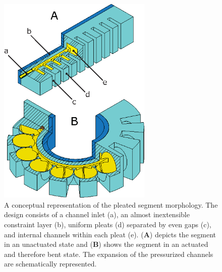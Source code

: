 \begin{figure}[htb]
\centering
\includegraphics[width=2.9in]{figures/actuators/pleated_design.eps}
\caption[A conceptual representation of the pleated segment morphology.]{A conceptual representation of the pleated segment morphology. The design consists of a channel inlet (a), an almost inextensible constraint layer (b), uniform pleats (d) separated by even gaps (c), and internal channels within each pleat (e). (\textbf{A}) depicts the segment in an unactuated state and (\textbf{B}) shows the segment in an actuated and therefore bent state. The expansion of the pressurized channels are schematically represented.}\label{fig:pleated_design}
\end{figure}

